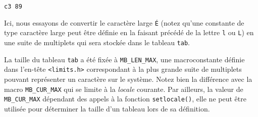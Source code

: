 \documentclass[]{article}
\newenvironment{Shaded}{}{}
\newcommand{\DataTypeTok}[1]{\textcolor[rgb]{0.56,0.13,0.00}{{#1}}}
\newcommand{\DecValTok}[1]{\textcolor[rgb]{0.25,0.63,0.44}{{#1}}}
\newcommand{\CharTok}[1]{\textcolor[rgb]{0.25,0.44,0.63}{{#1}}}
\newcommand{\StringTok}[1]{\textcolor[rgb]{0.25,0.44,0.63}{{#1}}}
\newcommand{\ImportTok}[1]{{#1}}
\newcommand{\ControlFlowTok}[1]{\textcolor[rgb]{0.00,0.44,0.13}{\textbf{{#1}}}}
\newcommand{\PreprocessorTok}[1]{\textcolor[rgb]{0.74,0.48,0.00}{{#1}}}
\newcommand{\NormalTok}[1]{{#1}}
\begin{document}
\begin{Shaded}
\end{Shaded}

\begin{verbatim}
c3 89
\end{verbatim}

Ici, nous essayons de convertir le caractère large \texttt{É} (notez
qu'une constante de type caractère large peut être définie en la faisant
précédé de la lettre \texttt{l} ou \texttt{L}) en une suite de
multiplets qui sera stockée dans le tableau \texttt{tab}.

La taille du tableau \texttt{tab} a été fixée à \texttt{MB\_LEN\_MAX},
une macroconstante définie dans l'en-tête
\texttt{\textless{}limits.h\textgreater{}} correspondant à la plus
grande suite de multiplets pouvant représenter un caractère sur le
système. Notez bien la différence avec la macro \texttt{MB\_CUR\_MAX}
qui se limite à la \emph{locale} courante. Par ailleurs, la valeur de
\texttt{MB\_CUR\_MAX} dépendant des appels à la fonction
\texttt{setlocale()}, elle ne peut être utilisée pour déterminer la
taille d'un tableau lors de sa définition.
\end{document}
